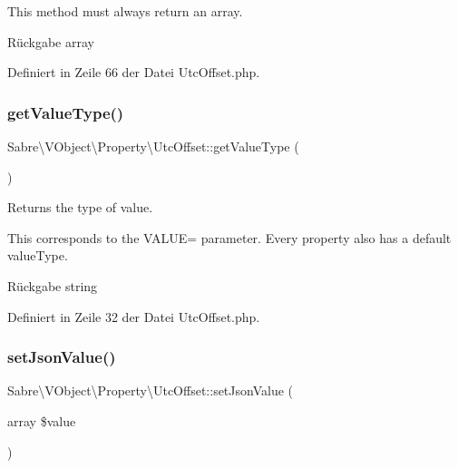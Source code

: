This method must always return an array.

\begin{DoxyReturn}{Rückgabe}
array 
\end{DoxyReturn}


Definiert in Zeile 66 der Datei Utc\+Offset.\+php.

\mbox{\label{class_sabre_1_1_v_object_1_1_property_1_1_utc_offset_aad566e796a99fa28176851b6f9b66a4d}} 
\subsubsection{\texorpdfstring{get\+Value\+Type()}{getValueType()}}
{\footnotesize\ttfamily Sabre\textbackslash{}\+V\+Object\textbackslash{}\+Property\textbackslash{}\+Utc\+Offset\+::get\+Value\+Type (\begin{DoxyParamCaption}{ }\end{DoxyParamCaption})}

Returns the type of value.

This corresponds to the V\+A\+L\+UE= parameter. Every property also has a \textquotesingle{}default\textquotesingle{} value\+Type.

\begin{DoxyReturn}{Rückgabe}
string 
\end{DoxyReturn}


Definiert in Zeile 32 der Datei Utc\+Offset.\+php.

\mbox{\label{class_sabre_1_1_v_object_1_1_property_1_1_utc_offset_a5c2436bb3c0829ff59902293ee260089}} 
\subsubsection{\texorpdfstring{set\+Json\+Value()}{setJsonValue()}}
{\footnotesize\ttfamily Sabre\textbackslash{}\+V\+Object\textbackslash{}\+Property\textbackslash{}\+Utc\+Offset\+::set\+Json\+Value (\begin{DoxyParamCaption}\item[{array}]{\$value }\end{DoxyParamCaption})}


